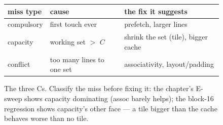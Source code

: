 \begin{figure}[htbp]
\centering
\begin{tabular}{lll}
\toprule
miss type & cause & the fix it suggests \\
\midrule
compulsory & first touch ever & prefetch, larger lines \\
capacity   & working set $>$ $C$ & shrink the set (tile), bigger cache \\
conflict   & too many lines to one set & associativity, layout/padding \\
\bottomrule
\end{tabular}
\caption{The three Cs. Classify the miss before fixing it: the
chapter's E-sweep shows capacity dominating (assoc barely helps);
the block-16 regression shows capacity's other face --- a tile
bigger than the cache behaves worse than no tile.}
\label{fig:threecs10}
\end{figure}
